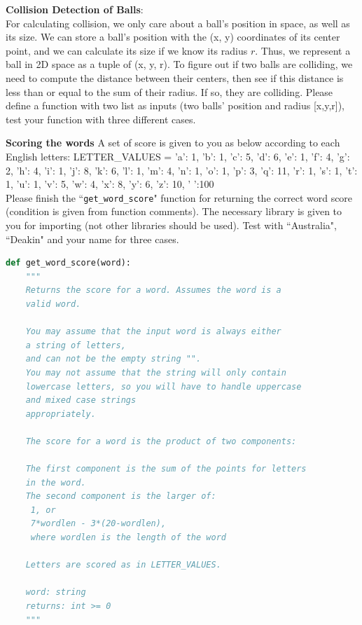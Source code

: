 \documentclass[a4paper]{article}
\begin{document}
    \begin{answer}[Question 1.6]
    \textbf{Collision Detection of Balls}: \\
    For calculating collision, we only care about a ball’s position in space, as well as its size. We can store a ball’s position with the (x, y) coordinates of its center point, and we can calculate its size if we know its radius $r$. Thus, we represent a ball in 2D space as a tuple of (x, y, r). To figure out if two balls are colliding, we need to compute the distance between their centers, then see if this distance is less than or equal to the sum of their radius. If so, they are colliding.
    Please define a function with two list as inputs (two balls' position and radius [x,y,r]), test your function with three different cases.
    \end{answer}


    \begin{answer}[Question 1.7]
    \textbf{Scoring the words}
    A set of score is given to you as below according to each English letters:
    LETTER_VALUES = { 'a': 1, 'b': 1, 'c': 5, 'd': 6, 'e': 1, 'f': 4, 'g': 2, 'h': 4, 'i': 1, 'j': 8, 'k': 6, 'l': 1, 'm': 4, 'n': 1, 'o': 1, 'p': 3, 'q': 11, 'r': 1, 's': 1, 't': 1, 'u': 1, 'v': 5, 'w': 4, 'x': 8, 'y': 6, 'z': 10, ' ':100 }\\

    Please finish the ``\texttt{get_word_score}" function for returning the correct word score (condition is given from function comments). The necessary library is given to you for importing (not other libraries should be used). Test with ``Australia", ``Deakin" and your name for three cases.

    \begin{lstlisting}[language=Python]
def get_word_score(word):
    """
    Returns the score for a word. Assumes the word is a
    valid word.

    You may assume that the input word is always either
    a string of letters,
    and can not be the empty string "".
    You may not assume that the string will only contain
    lowercase letters, so you will have to handle uppercase
    and mixed case strings
    appropriately.

    The score for a word is the product of two components:

	The first component is the sum of the points for letters
    in the word.
	The second component is the larger of:
     1, or
     7*wordlen - 3*(20-wordlen),
     where wordlen is the length of the word

    Letters are scored as in LETTER_VALUES.

    word: string
    returns: int >= 0
    """
    \end{lstlisting}

    \end{answer}
\end{document}
